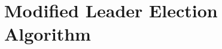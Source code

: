 \section{Modified Leader Election Algorithm}
\label{apdx:algorithm}

\makeatletter
\newlength{\continueindent}
\setlength{\continueindent}{4em}

\renewenvironment{algorithmic}[1][0]%
   {%
   \edef\ALG@numberfreq{#1}%
   \def\@currentlabel{\theALG@line}%
   \setcounter{ALG@line}{0}%
   \setcounter{ALG@rem}{0}%
   \let\\\algbreak%
   \expandafter\edef\csname ALG@currentblock@\theALG@nested\endcsname{0}%
   \expandafter\let\csname ALG@currentlifetime@\theALG@nested\endcsname\relax%
   \begin{list}%
      {\ALG@step}%
      {%
      \rightmargin\z@%
      \itemsep\z@ \itemindent\z@ \listparindent2em%
      \partopsep\z@ \parskip\z@ \parsep\z@%
      \labelsep 0.5em \topsep 0.2em%
      \ifthenelse{\equal{#1}{0}}%
         {\labelwidth 0.5em}%
         {\labelwidth 1.2em}%
       \leftmargin\labelwidth \addtolength{\leftmargin}{\labelsep}
      \ALG@tlm\z@%
      }%
      \parshape 2 \leftmargin \linewidth \continueindent \dimexpr\linewidth-\continueindent\relax
   \setcounter{ALG@nested}{0}%
   \ALG@beginalgorithmic%
   }%
   {%
   \ALG@closeloops%
   \expandafter\ifnum\csname ALG@currentblock@\theALG@nested\endcsname=0\relax%
   \else%
      \PackageError{algorithmicx}{Some blocks are not closed!!!}{}%
   \fi%
   \ALG@endalgorithmic%
   \end{list}%
   }%
\makeatother

